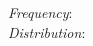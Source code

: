 \documentclass[preview]{standalone}
\begin{document}
\begin{center}
\vspace{0.3cm} \textit{Frequency}: \\ \vspace{0.4cm}\textit{Distribution}:
\end{center}
\end{document}
